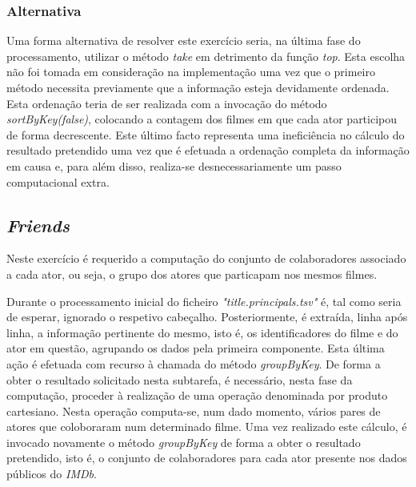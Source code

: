 \documentclass[a4paper]{report}
\begin{document}
            \subsubsection{Alternativa} \label{sssec:Task2-Top10-Alternativa}
                Uma forma alternativa de resolver este exercício seria, na última fase do processamento, utilizar o método \textit{take} em detrimento da função \textit{top}.
                Esta escolha não foi tomada em consideração na implementação uma vez que o primeiro método necessita previamente que a informação esteja devidamente ordenada.
                Esta ordenação teria de ser realizada com a invocação do método \textit{sortByKey(false)}, colocando a contagem dos filmes em que cada ator participou de forma decrescente.
                Este último facto representa uma ineficiência no cálculo do resultado pretendido uma vez que é efetuada a ordenação completa da informação em causa e, para além disso, realiza-se desnecessariamente um passo computacional extra.

        \subsection{\textit{Friends}} \label{subsec:Task2-Friends}
            Neste exercício é requerido a computação do conjunto de colaboradores associado a cada ator, ou seja, o grupo dos atores que particapam nos mesmos filmes.
                
            Durante o processamento inicial do ficheiro \textsl{"title.principals.tsv"} é, tal como seria de esperar, ignorado o respetivo cabeçalho.
            Posteriormente, é extraída, linha após linha, a informação pertinente do mesmo, isto é, os identificadores do filme e do ator em questão, agrupando os dados pela primeira componente. Esta última ação é efetuada com recurso à chamada do método \textit{groupByKey}.
            De forma a obter o resultado solicitado nesta subtarefa, é necessário, nesta fase da computação, proceder à realização de uma operação denominada por produto cartesiano. Nesta operação computa-se, num dado momento, vários pares de atores que coloboraram num determinado filme.
            Uma vez realizado este cálculo, é invocado novamente o método \textit{groupByKey} de forma a obter o resultado pretendido, isto é, o conjunto de colaboradores para cada ator presente nos dados públicos do \textit{IMDb}.
\end{document}
